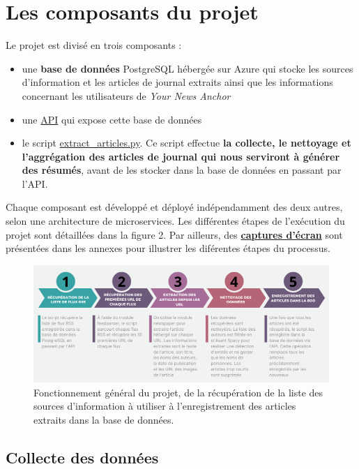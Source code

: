\documentclass[french]{article}
\begin{document}
    \section{Les composants du projet}
    Le projet est divisé en trois composants : 
    \begin{itemize}
        \item une \textbf{base de données} PostgreSQL hébergée sur Azure qui stocke les sources d'information et les articles de journal extraits ainsi que les informations concernant les utilisateurs de \textit{Your News Anchor}
        \item une \href{https://github.com/vinpap/your_news_anchor_db_api}{API} qui expose cette base de données
        \item le script \href{https://github.com/vinpap/your_news_anchor/blob/main/extract_articles.py}{extract\_articles.py}. Ce script effectue \textbf{la collecte, le nettoyage et l'aggrégation des articles de journal qui nous serviront à générer des résumés}, avant de les stocker dans la base de données en passant par l'API.
    \end{itemize}
    Chaque composant est développé et déployé indépendamment des deux autres, selon une architecture de microservices. Les différentes étapes de l'exécution du projet sont détaillées dans la figure 2. Par ailleurs, des \textbf{\hyperref[img:screenshots_processus]{captures d'écran}} sont présentées dans les annexes pour illustrer les diférentes étapes du processus.
    \begin{figure}[h]
        \includegraphics[width=15cm]{fonctionnement_script}
        \centering
        \caption{Fonctionnement général du projet, de la récupération de la liste des sources d'information à utiliser à l'enregistrement des articles extraits dans la base de données.}
        \centering
    \end{figure}
    
    \subsection{Collecte des données}
\end{document}

